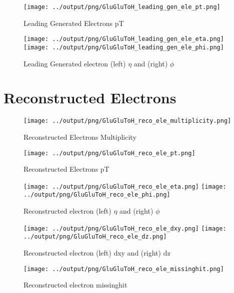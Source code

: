 \documentclass[11pt]{book}
\begin{document}
\begin{figure}[ht]
\centering
\texttt{[image: ../output/png/GluGluToH\_leading\_gen\_ele\_pt.png]}
\caption{Leading Generated Electrons pT}
\label{fig:gluglu_leading_gen_ele_pt}
\end{figure}

\begin{figure}[ht]
\centering
\texttt{[image: ../output/png/GluGluToH\_leading\_gen\_ele\_eta.png]}
\texttt{[image: ../output/png/GluGluToH\_leading\_gen\_ele\_phi.png]}
\caption{Leading Generated electron (left) $\eta$ and (right) $\phi$}
\label{fig:gluglu_leading_gen_ele_eta_phi}
\end{figure}
\clearpage

\section{Reconstructed Electrons}

\begin{figure}[ht]
\centering
\texttt{[image: ../output/png/GluGluToH\_reco\_ele\_multiplicity.png]}
\caption{Reconstructed Electrons Multiplicity}
\label{fig:gluglu_reco_ele_multiplicity}
\end{figure}

\begin{figure}[ht]
\centering
\texttt{[image: ../output/png/GluGluToH\_reco\_ele\_pt.png]}
\caption{Reconstructed Electrons pT}
\label{fig:gluglu_reco_ele_pt}
\end{figure}

\begin{figure}[ht]
\centering
\texttt{[image: ../output/png/GluGluToH\_reco\_ele\_eta.png]}
\texttt{[image: ../output/png/GluGluToH\_reco\_ele\_phi.png]}
\caption{Reconstructed electron (left) $\eta$ and (right) $\phi$}
\label{fig:gluglu_reco_ele_eta_phi}
\end{figure}

\begin{figure}[ht]
\centering
\texttt{[image: ../output/png/GluGluToH\_reco\_ele\_dxy.png]}
\texttt{[image: ../output/png/GluGluToH\_reco\_ele\_dz.png]}
\caption{Reconstructed electron (left) dxy and (right) dz}
\label{fig:gluglu_reco_ele_dxy_dz}
\end{figure}

\begin{figure}[ht]
\centering
\texttt{[image: ../output/png/GluGluToH\_reco\_ele\_missinghit.png]}
\caption{Reconstructed electron missinghit}
\label{fig:gluglu_reco_ele_missinghit}
\end{figure}
\end{document}
